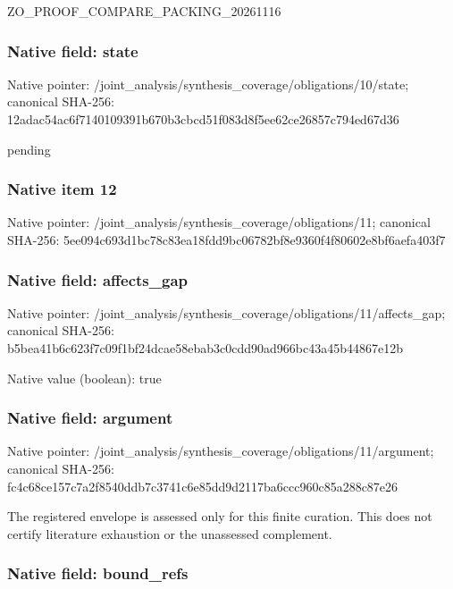 \documentclass[10pt,a4paper]{article}
\begin{document}
ZO\_PROOF\_COMPARE\_PACKING\_20261116


\subsubsection{Native field: state}


Native pointer: /joint\_analysis/synthesi\allowbreak{}s\_coverage/obligations/1\allowbreak{}0/state; canonical SHA-256: 12adac54ac6f7140109391b6\allowbreak{}70b3cbcd51f083d8f5ee62ce\allowbreak{}26857c794ed67d36


pending


\subsubsection{Native item 12}


Native pointer: /joint\_analysis/synthesi\allowbreak{}s\_coverage/obligations/1\allowbreak{}1; canonical SHA-256: 5ee094c693d1bc78c83ea18f\allowbreak{}dd9bc06782bf8e9360f4f806\allowbreak{}02e8bf6aefa403f7



\subsubsection{Native field: affects\_gap}


Native pointer: /joint\_analysis/synthesi\allowbreak{}s\_coverage/obligations/1\allowbreak{}1/affects\_gap; canonical SHA-256: b5bea41b6c623f7c09f1bf24\allowbreak{}dcae58ebab3c0cdd90ad966b\allowbreak{}c43a45b44867e12b



Native value (boolean): true



\subsubsection{Native field: argument}


Native pointer: /joint\_analysis/synthesi\allowbreak{}s\_coverage/obligations/1\allowbreak{}1/argument; canonical SHA-256: fc4c68ce157c7a2f8540ddb7\allowbreak{}c3741c6e85dd9d2117ba6ccc\allowbreak{}960c85a288c87e26


The registered envelope is assessed only for this finite curation. This does not certify literature exhaustion or the unassessed complement.


\subsubsection{Native field: bound\_refs}
\end{document}
